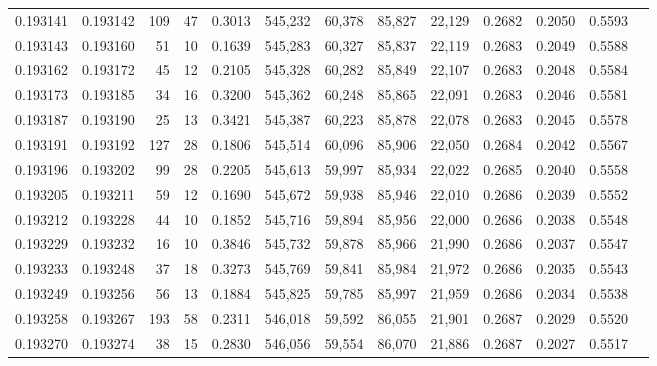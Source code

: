 \begin{tabular}{rrrrrrrrrrrrr}
0.193141 & 0.193142 &   109 &  47 &                                     0.3013 & 545,232 &  60,378 &  85,827 &  22,129 & 0.2682 & 0.2050 & 0.5593 \\
0.193143 & 0.193160 &    51 &  10 &                                     0.1639 & 545,283 &  60,327 &  85,837 &  22,119 & 0.2683 & 0.2049 & 0.5588 \\
0.193162 & 0.193172 &    45 &  12 &                                     0.2105 & 545,328 &  60,282 &  85,849 &  22,107 & 0.2683 & 0.2048 & 0.5584 \\
0.193173 & 0.193185 &    34 &  16 &                                     0.3200 & 545,362 &  60,248 &  85,865 &  22,091 & 0.2683 & 0.2046 & 0.5581 \\
0.193187 & 0.193190 &    25 &  13 &                                     0.3421 & 545,387 &  60,223 &  85,878 &  22,078 & 0.2683 & 0.2045 & 0.5578 \\
0.193191 & 0.193192 &   127 &  28 &                                     0.1806 & 545,514 &  60,096 &  85,906 &  22,050 & 0.2684 & 0.2042 & 0.5567 \\
0.193196 & 0.193202 &    99 &  28 &                                     0.2205 & 545,613 &  59,997 &  85,934 &  22,022 & 0.2685 & 0.2040 & 0.5558 \\
0.193205 & 0.193211 &    59 &  12 &                                     0.1690 & 545,672 &  59,938 &  85,946 &  22,010 & 0.2686 & 0.2039 & 0.5552 \\
0.193212 & 0.193228 &    44 &  10 &                                     0.1852 & 545,716 &  59,894 &  85,956 &  22,000 & 0.2686 & 0.2038 & 0.5548 \\
0.193229 & 0.193232 &    16 &  10 &                                     0.3846 & 545,732 &  59,878 &  85,966 &  21,990 & 0.2686 & 0.2037 & 0.5547 \\
0.193233 & 0.193248 &    37 &  18 &                                     0.3273 & 545,769 &  59,841 &  85,984 &  21,972 & 0.2686 & 0.2035 & 0.5543 \\
0.193249 & 0.193256 &    56 &  13 &                                     0.1884 & 545,825 &  59,785 &  85,997 &  21,959 & 0.2686 & 0.2034 & 0.5538 \\
0.193258 & 0.193267 &   193 &  58 &                                     0.2311 & 546,018 &  59,592 &  86,055 &  21,901 & 0.2687 & 0.2029 & 0.5520 \\
0.193270 & 0.193274 &    38 &  15 &                                     0.2830 & 546,056 &  59,554 &  86,070 &  21,886 & 0.2687 & 0.2027 & 0.5517 \\

\end{tabular}
